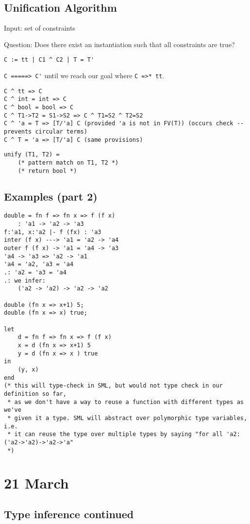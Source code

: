 \documentclass[11pt]{article}
\begin{document}
\subsection{Unification Algorithm}
Input: set of constraints

Question: Does there exist an instantiation such that all constraints are true?

\verb~C := tt | C1 ^ C2 | T = T'~

\verb~C =====> C'~ until we reach our goal where \verb~C =>* tt~.

\begin{verbatim}
C ^ tt => C
C ^ int = int => C
C ^ bool = bool => C
C ^ T1->T2 = S1->S2 => C ^ T1=S2 ^ T2=S2
C ^ 'a = T => [T/'a] C (provided 'a is not in FV(T)) (occurs check -- prevents circular terms)
C ^ T = 'a => [T/'a] C (same provisions)
\end{verbatim}

\begin{verbatim}
unify (T1, T2) =
    (* pattern match on T1, T2 *)
    (* return bool *)
\end{verbatim}

\subsection{Examples (part 2)}
\begin{verbatim}
double = fn f => fn x => f (f x)
    : 'a1 -> 'a2 -> 'a3
f:'a1, x:'a2 |- f (fx) : 'a3
inter (f x) ---> 'a1 = 'a2 -> 'a4
outer f (f x) -> 'a1 = 'a4 -> 'a3
'a4 -> 'a3 => 'a2 -> 'a1
'a4 = 'a2, 'a3 = 'a4
.: 'a2 = 'a3 = 'a4
.: we infer:
    ('a2 -> 'a2) -> 'a2 -> 'a2

double (fn x => x+1) 5;
double (fn x => x) true;

let
    d = fn f => fn x => f (f x)
    x = d (fn x => x+1) 5
    y = d (fn x => x ) true
in
    (y, x)
end
(* this will type-check in SML, but would not type check in our definition so far,
 * as we don't have a way to reuse a function with different types as we've 
 * given it a type. SML will abstract over polymorphic type variables, i.e.
 * it can reuse the type over multiple types by saying "for all 'a2:('a2->'a2)->'a2->'a"
 *)
\end{verbatim}

\section{21 March}
\subsection{Type inference continued}
\end{document}

